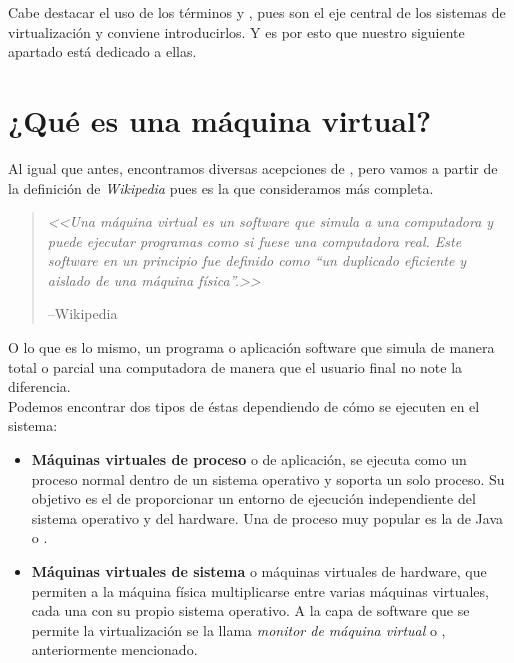 Cabe destacar el uso de los términos \emph{} y , pues son el eje central de los sistemas de virtualización y conviene introducirlos. Y es por esto que nuestro siguiente apartado está dedicado a ellas.

\section{¿Qué es una máquina virtual?}

Al igual que antes, encontramos diversas acepciones de \emph{}, pero vamos a partir de la definición de \emph{Wikipedia} pues es la que consideramos más completa.

\begin{quote}
\emph{<<Una máquina virtual es un software que simula a una computadora y puede ejecutar programas como si fuese una computadora real. Este software en un principio fue definido como \textquotedblleft un duplicado eficiente y aislado de una máquina física\textquotedblright.>>}
\begin{flushright}
--Wikipedia\cite{defmaqvirwiki}
\end{flushright}
\end{quote}

O lo que es lo mismo, un programa o aplicación software que simula de manera total o parcial una computadora de manera que el usuario final no note la diferencia.\\

Podemos encontrar dos tipos de éstas dependiendo de cómo se ejecuten en el sistema:

\begin{itemize}
\item \textbf{Máquinas virtuales de proceso} o  de aplicación, se ejecuta como un proceso normal dentro de un sistema operativo y soporta un solo proceso. Su objetivo es el de proporcionar un entorno de ejecución independiente del sistema operativo y del hardware. Una  de proceso muy popular es la de Java o \emph{}.
\item \textbf{Máquinas virtuales de sistema} o máquinas virtuales de hardware, que permiten a la máquina física multiplicarse entre varias máquinas virtuales, cada una con su propio sistema operativo. A la capa de software que se permite la virtualización se la llama \emph{monitor de máquina virtual} o , anteriormente mencionado.
\end{itemize}

